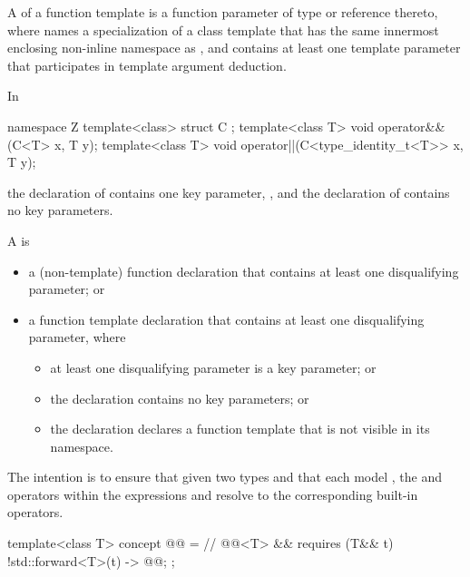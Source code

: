 \pnum
{}%
A  of a function template 
is a function parameter of type \cv{}  or reference thereto,
where  names a specialization of a class template that
has the same innermost enclosing non-inline namespace as , and
 contains at least one template parameter that
participates in template argument deduction.
\begin{example}
In
\begin{codeblock}
namespace Z {
  template<class> struct C {};
  template<class T>
    void operator&&(C<T> x, T y);
  template<class T>
    void operator||(C<type_identity_t<T>> x, T y);
}
\end{codeblock}
the declaration of 
contains one key parameter, , and
the declaration of 
contains no key parameters.
\end{example}

\pnum
A  is

\begin{itemize}
\item
a (non-template) function declaration that
contains at least one disqualifying parameter; or

\item
a function template declaration that
contains at least one disqualifying parameter, where
\begin{itemize}
\item at least one disqualifying parameter is a key parameter; or
\item the declaration contains no key parameters; or
\item the declaration declares a function template that
is not visible in its namespace.
\end{itemize}
\end{itemize}

\pnum
\begin{note}
The intention is to ensure that
given two types  and 
that each model ,
the \tcode{\&\&} and \tcode{||} operators within the expressions
 and
resolve to the corresponding built-in operators.
\end{note}

\begin{itemdecl}
template<class T>
  concept @@ =                // \expos
    @@<T> && requires (T&& t) {
      { !std::forward<T>(t) } -> @@;
    };
\end{itemdecl}

